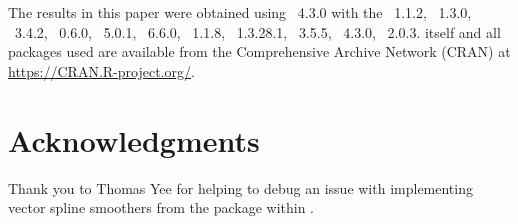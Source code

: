 \documentclass[nojss]{jss}
\begin{document}
The results in this paper were obtained using
~4.3.0 with the
~1.1.2,
~1.3.0,
~3.4.2,
~0.6.0,
~5.0.1,
~6.6.0,
~1.1.8,
~1.3.28.1,
~3.5.5,
~4.3.0,
~2.0.3.  itself
and all packages used are available from the Comprehensive
 Archive Network (CRAN) at
\url{https://CRAN.R-project.org/}.

\section*{Acknowledgments}

\begin{leftbar}
Thank you to Thomas Yee for helping to debug an issue with implementing vector spline smoothers from the  package within .
\end{leftbar}




\newpage
\end{document}
